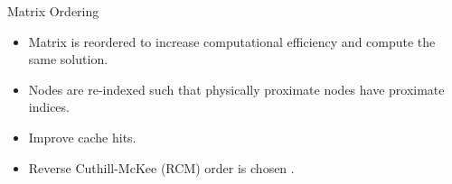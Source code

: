 \begin{frame}{Matrix Ordering}
  \begin{itemize}
    \item Matrix is reordered to increase computational efficiency and compute
      the same solution.
    \item Nodes are re-indexed such that physically proximate nodes have
      proximate indices.
    \item Improve cache hits.
    \item Reverse Cuthill-McKee (RCM) order is chosen \cite{rcm}.
  \end{itemize}
  \vspace{-0.25in}
  \begin{figure}
    \centering
    \hspace{0.1in}
    \label{fig:sparsity_pattern}
  \end{figure}
\end{frame}

